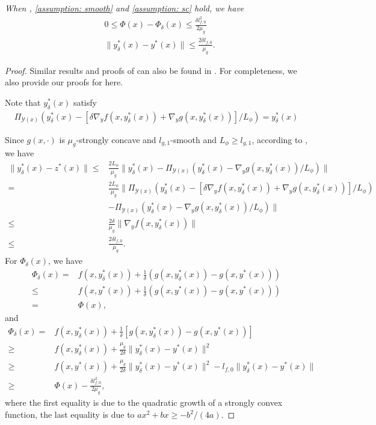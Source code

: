 \documentclass{article}
\newcommand{\Yc}{\mathcal{Y}}
\theoremstyle{plain}
\theoremstyle{definition}
\theoremstyle{remark}
\begin{document}
\subsection*{}
\emph{When , \ref{assumption: smooth} and \ref{assumption: sc} hold, we have
    \begin{align*}
    &0\leq \Phi(x)-\Phi_\delta(x)\leq \frac{\delta l_{f,0}^2}{2\mu_g}\\
    &\|y_\delta^*(x)-y^*(x)\|\leq\frac{2\delta l_{f,0}}{\mu_g}.
    \end{align*}}
\begin{proof}
Similar results and proofs of  can also be found in \cite{kwon2023penalty, jiang2024primal}. For completeness, we also provide our proofs for  here.
    
Note that $y_\delta^*(x)$ satisfy
    \begin{align*}
        \Pi_{\Yc(x)}(y_\delta^*(x)-[\delta \nabla_y f(x, y_\delta^*(x))+\nabla_y g(x, y_\delta^*(x))]/L_\phi )=y_\delta^*(x)
    \end{align*}

Since $g(x, \cdot)$ is $\mu_g$-strongly concave and $l_{g,1}$-smooth and $L_\phi\geq l_{g,1}$, according to , we have
\begin{align*}
    \|y_\delta^*(x)-z^*(x)\|\leq& \frac{2L_\phi}{\mu_g}\|y_\delta^*(x)-\Pi_{\Yc(x)}(y_\delta^*(x)-\nabla_y g(x, y_\delta^*(x))/L_\phi)\|\\
    =&\frac{2L_\phi}{\mu_g}\|\Pi_{\Yc(x)}(y_\delta^*(x)-[\delta \nabla_y f(x, y_\delta^*(x))+\nabla_y g(x, y_\delta^*(x))]/L_\phi )\\
    &-\Pi_{\Yc(x)}(y_\delta^*(x)-\nabla_y g(x, y_\delta^*(x))/L_\phi)\|\\
    \leq&\frac{2\delta}{\mu_g}\|\nabla_y f(x, y_\delta^*(x))\|\\
    \leq&\frac{2\delta l_{f,0}}{\mu_g}.
\end{align*}
For $\Phi_\delta(x)$, we have
    \begin{align*}
        \Phi_\delta(x)=&f(x, y_\delta^*(x))+\frac{1}{\delta}(g(x, y_\delta^*(x))-g(x,y^*(x)))\\
        \leq& f(x, y^*(x))+\frac{1}{\delta}(g(x, y^*(x))-g(x,y^*(x)))\\
        =&\Phi(x),
    \end{align*}
and
    \begin{align*}
        \Phi_\delta(x)=&f(x, y_\delta^*(x))+\frac{1}{\delta}[g(x, y^*_\delta(x))-g(x, y^*(x))]\\
        \geq& f(x, y_\delta^*(x))+\frac{\mu_g}{2\delta}\|y_\delta^*(x)-y^*(x)\|^2\\
        \geq&f(x, y^*(x))+\frac{\mu_g}{2\delta}\|y_\delta^*(x)-y^*(x)\|^2-l_{f,0}\|y_\delta^*(x)-y^*(x)\|\\
        \geq&\Phi(x)-\frac{\delta l_{f,0}^2}{2\mu_g},
    \end{align*}
where the first equality is due to the quadratic growth of a strongly convex function, the last equality is due to $ax^2+bx\geq -b^2/(4a)$.

\end{proof}
\end{document}
